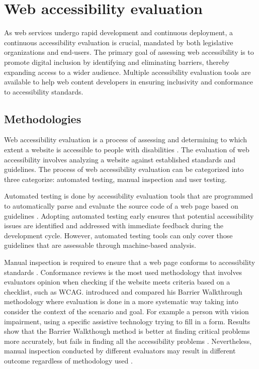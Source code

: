 \chapter{Web accessibility evaluation\label{accessibility_evaluation}}

As web services undergo rapid development and continuous deployment, a continuous accessibility evaluation is crucial, mandated by both legislative organizations and end-users. The primary goal of assessing web accessibility is to promote digital inclusion by identifying and eliminating barriers, thereby expanding access to a wider audience. Multiple accessibility evaluation tools are available to help web content developers in ensuring inclusivity and conformance to accessibility standards.

\section{Methodologies}

Web accessibility evaluation is a process of assessing and determining to which extent a website is accessible to people with disabilities \citep[Chapter~26.2]{webaccessibility}. The evaluation of web accessibility involves analyzing a website against established standards and guidelines. The process of web accessibility evaluation can be categorized into three categorize: automated testing, manual inspection and user testing.

Automated testing is done by accessibility evaluation tools that are programmed to automatically parse and evaluate the source code of a web page based on guidelines \citep[Chapter~26.2]{webaccessibility}. 
Adopting automated testing early ensures that potential accessibility issues are identified and addressed with immediate feedback during the development cycle. However, automated testing tools can only cover those guidelines that are assessable through machine-based analysis. 

Manual inspection is required to ensure that a web page conforms to accessibility standards \citep[Chapter~26.2]{webaccessibility}. Conformance reviews is the most used methodology that involves evaluators opinion when checking if the website meets criteria based on a checklist, such as WCAG. \cite{comparative_accessibility_methods} introduced and compared his Barrier Walkthrough methodology where evaluation is done in a more systematic way taking into consider the context of the scenario and goal. For example a person with vision impairment, using a specific assistive technology trying to fill in a form. Results show that the Barrier Walkthough method is better at finding critical problems more accurately, but fails in finding all the accessibility problems \citep{comparative_accessibility_methods}. Nevertheless, manual inspection conducted by different evaluators may result in different outcome regardless of methodology used \citep{accessibility_evaluation_experts, 10.1145/1878803.1878813}. 

